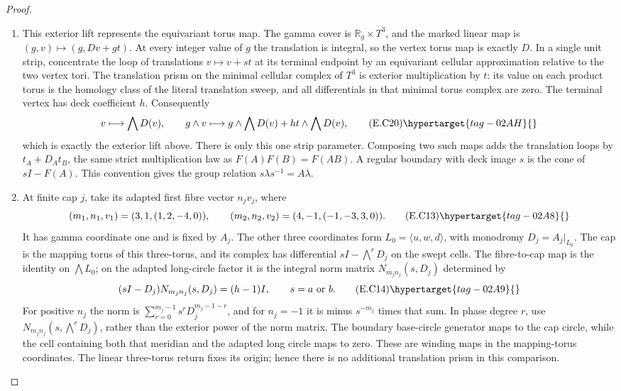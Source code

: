 \begin{proof}
\begin{enumerate}[label={$\langle1\rangle$\arabic*.},leftmargin=*]
\item This exterior lift represents the equivariant
torus map. The gamma cover is
$\mathbb R_g\times T^3$, and the marked linear map is
$(g,v)\mapsto(g,Dv+gt)$. At every integer value of $g$
the translation is integral, so the vertex torus map
is exactly $D$. In a single unit strip, concentrate
the loop of translations $v\mapsto v+st$ at its
terminal endpoint by an equivariant cellular
approximation relative to the two vertex tori.
The translation prism on the minimal cellular complex
of $T^3$ is exterior multiplication by $t$: its value
on each product torus is the homology class of the
literal translation sweep, and all differentials
in that minimal torus complex are zero. The terminal
vertex has deck coefficient $h$. Consequently
\[
 v\longmapsto\bigwedge D(v),\qquad
 g\wedge v\longmapsto
 g\wedge\bigwedge D(v)+ht\wedge\bigwedge D(v),
 \tag{E.C20}\hypertarget{tag-02AH}{}\label{maps:eq:E.C20}
\]
which is exactly the exterior lift above. There is
only this one strip parameter. Composing two such
maps adds the translation loops by
$t_A+D_At_B$, the same strict multiplication law
as $F(A)F(B)=F(AB)$. 
A regular
boundary with deck image $s$ is the cone of $sI-F(A)$.
This convention gives the group relation
$s\lambda s^{-1}=A\lambda$.

\item At finite cap $j$, take its adapted first fibre vector
$n_jv_j$, where
\[
 (m_1,n_1,v_1)=(3,1,(1,2,-4,0)),\qquad
 (m_2,n_2,v_2)=(4,-1,(-1,-3,3,0)).
 \tag{E.C13}\hypertarget{tag-02A8}{}\label{maps:eq:E.C13}
\]
It has gamma coordinate one and is fixed by $A_j$.
The other three coordinates form $L_0=\langle u,w,d\rangle$,
with monodromy $D_j=A_j|_{L_0}$. The cap is the
mapping torus of this three-torus, and its complex has
differential $sI-\bigwedge^rD_j$ on the swept cells.
The fibre-to-cap map is the identity on $\bigwedge L_0$;
on the adapted long-circle factor it is the integral
norm matrix $N_{m_jn_j}(s,D_j)$ determined by
\[
 (sI-D_j)N_{m_jn_j}(s,D_j)=(h-1)I,
 \qquad s=a\text{ or }b.
 \tag{E.C14}\hypertarget{tag-02A9}{}\label{maps:eq:E.C14}
\]
For positive $n_j$ the norm is
$\sum_{r=0}^{m_j-1}s^rD_j^{m_j-1-r}$, and for
$n_j=-1$ it is minus $s^{-m_j}$ times that sum.
In phase degree $r$, use
$N_{m_jn_j}(s,\bigwedge^rD_j)$, rather than the
exterior power of the norm matrix.
The boundary base-circle generator maps to the cap circle, while
the cell containing both that meridian and the adapted
long circle maps to zero. These are winding
maps in the mapping-torus coordinates. The linear
three-torus return fixes its origin; hence there is
no additional translation prism in this comparison.


\end{enumerate}
\end{proof}
